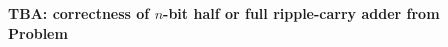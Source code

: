 \documentclass[handout]{mcs}
\begin{document}
\renewcommand{\reading}{Chapter~\bref{induction_chap},
  \emph{Induction}; Chapter~\bref{partial-order-chapter},
  \emph{Partial Orders}, \S\S 1--3.}










\begin{problem}

\textbf{TBA: correctness of $n$-bit half or full ripple-carry adder
  from Problem~}
\end{problem}




\end{document}
